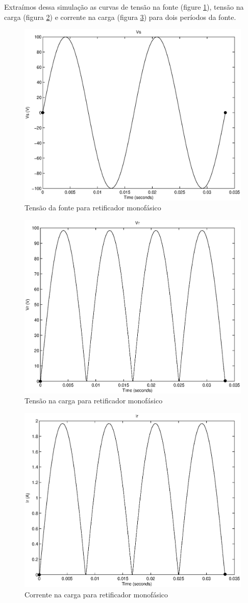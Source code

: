 \documentclass{report}
\begin{document}
Extraímos dessa simulação as curvas de tensão na fonte (figure \ref{fig:mvs}), tensão na carga (figura \ref{fig:mvr}) e corrente na carga (figura \ref{fig:mir}) para dois períodos da fonte.
\begin{figure}[H]
	\centering
	\includegraphics[width=0.7\linewidth]{matlab/mono_vs}
	\caption{Tensão da fonte para retificador monofásico}
	\label{fig:mvs}
\end{figure}
\begin{figure}[H]
	\centering
	\includegraphics[width=0.7\linewidth]{matlab/mono_vr}
	\caption{Tensão na carga para retificador monofásico}
	\label{fig:mvr}
\end{figure}
\begin{figure}[H]
	\centering
	\includegraphics[width=0.7\linewidth]{matlab/mono_ir}
	\caption{Corrente na carga para retificador monofásico}
	\label{fig:mir}
\end{figure}
\end{document}
